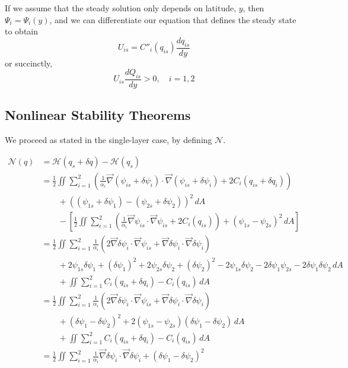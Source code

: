 \documentclass[12pt]{article}
\begin{document}
      If we assume that the steady solution only depends on latitude, $y$, then $\Psi_i = \Psi_i(y)$, and we can differentiate our equation that defines the steady state to obtain
      $$
      U_{is} = C''_i(q_{is}) \frac{dq_{is}}{dy}
      $$
      or succinctly,
      $$
      U_{is} \frac{d Q_{is}}{dy} > 0, \quad i=1,2
      $$

  \subsection{Nonlinear Stability Theorems}
    We proceed as stated in the single-layer case, by defining $\mathcal{N}$.

    \begin{align*}
      \mathcal{N}(q) 
      & = \mathcal{H}(q_s + \delta q) - \mathcal{H}(q_s) \\
      &= \frac12 \iint \sum_{i=1}^2 \left( \frac{1}{\alpha_i}\vec\nabla (\psi_{is} + \delta\psi_i) \cdot \vec\nabla (\psi_{is} + \delta\psi_i) + 2C_i(q_{is} + \delta q_i) \right) \\
      &\quad\quad + ((\psi_{1s} + \delta\psi_1) - (\psi_{2s} + \delta\psi_2))^2 \, dA \\
      &\quad\quad - \left[ \frac12 \iint \sum_{i=1}^2 \left( \frac{1}{\alpha_i}\vec\nabla \psi_{is} \cdot \vec\nabla \psi_{is} + 2C_i(q_{is}) \right) + (\psi_{1s} - \psi_{2s})^2 \, dA \right] \\
      &= \frac12 \iint \sum_{i=1}^2 \frac{1}{\alpha_i} (2 \vec\nabla\delta\psi_i \cdot \vec\nabla\psi_{is} + \vec\nabla\delta\psi_i \cdot \vec\nabla\delta\psi_i) \\
      &\quad\quad + 2\psi_{1s}\delta\psi_1 + (\delta\psi_1)^2 + 2\psi_{2s}\delta\psi_2 + (\delta\psi_2)^2 - 2\psi_{1s}\delta\psi_2 - 2\delta\psi_1\psi_{2s} - 2\delta\psi_1\delta\psi_2 \, dA \\
      &\quad\quad + \iint \sum_{i=1}^2 C_i(q_{is} + \delta q_i) - C_i(q_{is}) \, dA \\
      &= \frac12 \iint \sum_{i=1}^2 \frac{1}{\alpha_i} (2 \vec\nabla\delta\psi_i \cdot \vec\nabla\psi_{is} + \vec\nabla\delta\psi_i \cdot \vec\nabla\delta\psi_i) \\
      &\quad\quad + (\delta\psi_1 - \delta\psi_2)^2 + 2(\psi_{1s} - \psi_{2s})(\delta\psi_1 - \delta\psi_2) \, dA \\
      &\quad\quad + \iint \sum_{i=1}^2 C_i(q_{is} + \delta q_i) - C_i(q_{is}) \, dA \\
      &= \frac12 \iint \sum_{i=1}^2 \frac{1}{\alpha_i} \vec\nabla\delta\psi_i \cdot \vec\nabla\delta\psi_i + (\delta\psi_1 - \delta\psi_2)^2 \\

\end{align*}
\end{document}
